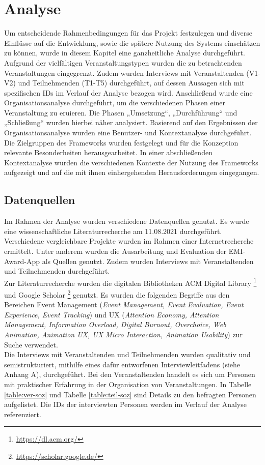 \chapter{Analyse}

Um entscheidende Rahmenbedingungen für das Projekt festzulegen und
diverse Einflüsse auf die Entwicklung, sowie die spätere Nutzung des Systems
einschätzen zu können, wurde in diesem Kapitel eine ganzheitliche Analyse
durchgeführt. Aufgrund der vielfältigen Veranstaltungstypen wurden die zu
betrachtenden Veranstaltungen eingegrenzt. Zudem wurden Interviews mit
Veranstaltenden (V1-V2) und Teilnehmenden  (T1-T5) durchgeführt, auf dessen
Aussagen sich mit spezifischen IDs im Verlauf der Analyse bezogen wird.
Anschließend wurde eine Organisationsanalyse durchgeführt, um die verschiedenen
Phasen einer Veranstaltung zu eruieren. Die Phasen „Umsetzung“, „Durchführung“
und „Schließung“ wurden hierbei näher analysiert. Basierend auf den Ergebnissen
der Organisationsanalyse wurden eine Benutzer- und Kontextanalyse durchgeführt.
Die Zielgruppen des Frameworks wurden festgelegt und für die Konzeption
relevante Besonderheiten herausgearbeitet. In einer abschließenden
Kontextanalyse wurden die verschiedenen Kontexte der Nutzung des Frameworks
aufgezeigt und auf die mit ihnen einhergehenden Herausforderungen eingegangen.


\section{Datenquellen}

Im Rahmen der Analyse wurden verschiedene Datenquellen genutzt. Es wurde eine
wissenschaftliche Literaturrecherche am 11.08.2021 durchgeführt. Verschiedene
vergleichbare Projekte wurden im Rahmen einer Internetrecherche ermittelt. Unter
anderem wurden die Ausarbeitung und Evaluation der EMI-Award-App als Quellen
genutzt. Zudem wurden Interviews mit Veranstaltenden und Teilnehmenden
durchgeführt. \\
Zur Literaturrecherche wurden die digitalen Bibliotheken ACM Digital
Library \footnote{\url{https://dl.acm.org/}} und Google
Scholar \footnote{\url{https://scholar.google.de/}} genutzt. Es wurden die
folgenden Begriffe aus den Bereichen Event Management (\emph{Event Management,
    Event Evaluation, Event Experience, Event Tracking}) und UX (\emph{Attention
    Economy, Attention Management, Information Overload, Digital Burnout,
    Overchoice, Web Animation, Animation UX, UX Micro Interaction, Animation
    Usability}) zur Suche verwendet. \\
Die Interviews mit Veranstaltenden und Teilnehmenden wurden qualitativ und
semistrukturiert, mithilfe eines dafür entworfenen Interviewleitfadens (siehe
Anhang A), durchgeführt. Bei den Veranstaltenden handelt es sich um Personen mit
praktischer Erfahrung in der Organisation von Veranstaltungen. In Tabelle
\ref{table:ver-soz} und Tabelle \ref{table:teil-soz} sind Details zu den
befragten Personen aufgelistet. Die IDs der interviewten Personen werden im
Verlauf der Analyse referenziert.

